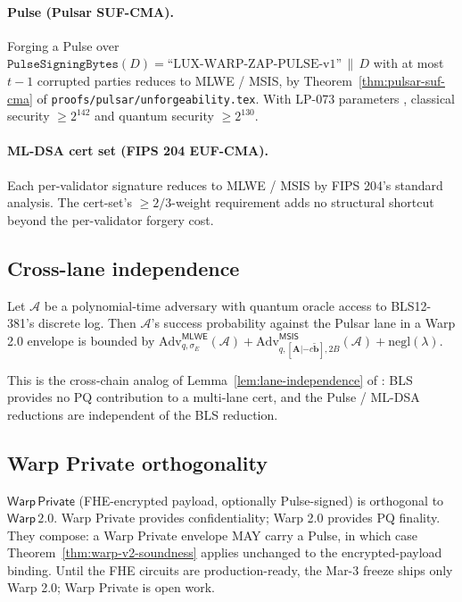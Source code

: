 \paragraph{Pulse (Pulsar SUF-CMA).} Forging a Pulse over $\texttt{PulseSigningBytes}(D) = \text{``LUX-WARP-ZAP-PULSE-v1''}\,\|\,D$ with at most $t-1$ corrupted parties reduces to MLWE / MSIS, by Theorem~\ref{thm:pulsar-suf-cma} of \texttt{proofs/pulsar/unforgeability.tex}. With LP-073 parameters \cite{luxpulsar}, classical security $\geq 2^{142}$ and quantum security $\geq 2^{130}$.

\paragraph{ML-DSA cert set (FIPS 204 EUF-CMA).} Each per-validator signature reduces to MLWE / MSIS by FIPS 204's standard analysis. The cert-set's $\geq 2/3$-weight requirement adds no structural shortcut beyond the per-validator forgery cost.

\subsection{Cross-lane independence}

\begin{lemma}
\label{lem:lane-independence-warp}
Let $\mathcal{A}$ be a polynomial-time adversary with quantum oracle access to BLS12-381's discrete log. Then $\mathcal{A}$'s success probability against the Pulsar lane in a Warp 2.0 envelope is bounded by $\mathrm{Adv}^{\mathsf{MLWE}}_{q,\sigma_E}(\mathcal{A}) + \mathrm{Adv}^{\mathsf{MSIS}}_{q, [\mathbf{A}|-c\tilde{\mathbf{b}}], 2B}(\mathcal{A}) + \mathrm{negl}(\lambda)$.
\end{lemma}

This is the cross-chain analog of Lemma~\ref{lem:lane-independence} of \cite{luxquasarhorizon}: BLS provides no PQ contribution to a multi-lane cert, and the Pulse / ML-DSA reductions are independent of the BLS reduction.

\subsection{Warp Private orthogonality}

\begin{remark}
\label{rem:warp-private-orthogonal}
$\mathsf{Warp\,Private}$ (FHE-encrypted payload, optionally Pulse-signed) is orthogonal to $\mathsf{Warp\,2.0}$. Warp Private provides confidentiality; Warp 2.0 provides PQ finality. They compose: a Warp Private envelope MAY carry a Pulse, in which case Theorem~\ref{thm:warp-v2-soundness} applies unchanged to the encrypted-payload binding. Until the FHE circuits are production-ready, the Mar-3 freeze ships only Warp 2.0; Warp Private is open work.
\end{remark}

